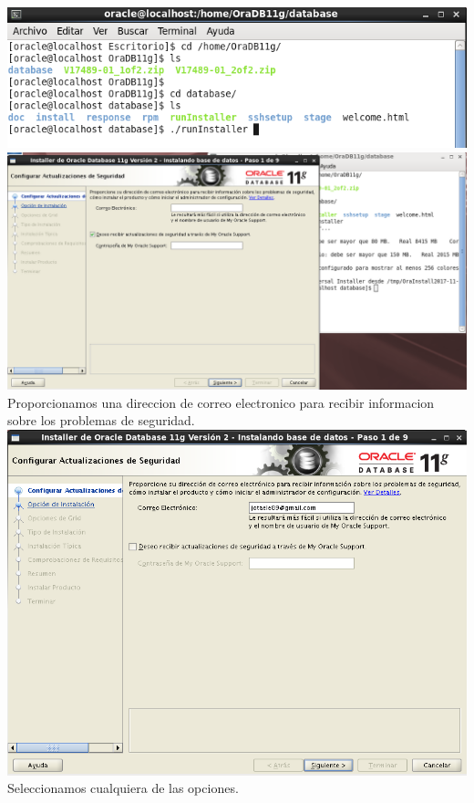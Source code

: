 \documentclass[12pt,letterpaper]{article}
\begin{document}
\begin{center}
\includegraphics[width=15cm]{./oraclelinux/10.png}
\includegraphics[width=15cm]{./oraclelinux/11.png}\\
Proporcionamos una direccion de correo electronico para recibir informacion sobre los problemas de seguridad.\\
\includegraphics[width=15cm]{./oraclelinux/12.png}\\
Seleccionamos cualquiera de las opciones.\\

\end{center}
\end{document}
